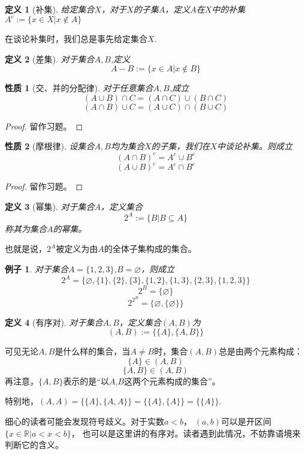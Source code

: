 \documentclass[a4paper, 11pt]{article} %
\newtheorem{prop}{性质}[subsection]
\newtheorem{definition}{定义}[subsection]
\newtheorem{example}{例子}[subsection]
\begin{document}
\begin{definition}[补集]
给定集合$X$，对于$X$的子集$A$，定义$A$在$X$中的补集
$A^c:=\{x\in X|x\not\in A\}$
\end{definition}
在谈论补集时，我们总是事先给定集合$X$.

\begin{definition}[差集]
对于集合$A,B$,定义
$$A-B:=\{x\in A|x\not\in B\}$$
\end{definition}

\begin{prop}[交、并的分配律]\label{set-fenpeilv}
对于任意集合$A,B$,成立
$$(A\cup B)\cap C=(A\cap C)\cup(B\cap C)$$
$$(A\cap B)\cup C=(A\cup C)\cap(B\cup C)$$
\end{prop}
\begin{proof}
留作习题。
\end{proof}

\begin{prop}[摩根律]\label{set-morgen}
设集合$A,B$均为集合$X$的子集，我们在$X$中谈论补集。则成立
$$(A\cap B)^c=A^c\cup B^c$$
$$(A\cup B)^c=A^c\cap B^c$$
\end{prop}
\begin{proof}
留作习题。
\end{proof}

\begin{definition}[幂集]
对于集合$A$，定义集合
$$2^A:=\{B|B\subseteq A\}$$
称其为集合$A$的幂集。
\end{definition}
也就是说，$2^A$被定义为由$A$的全体子集构成的集合。

\begin{example}对于集合$A=\{1,2,3\}$,$B=\varnothing$，则成立
$$2^A=\{\varnothing,\{1\},\{2\},\{3\},
\{1,2\},\{1,3\},\{2,3\},\{1,2,3\}\}$$
$$2^B=\{\varnothing\}$$
$$2^{2^B}=\{\varnothing,\{\varnothing\}\}$$
\end{example}

\begin{definition}[有序对]
对于集合$A,B$，定义集合$(A,B)$为
$$(A,B):=\{\{A\},\{A,B\}\}$$
\end{definition}
可见无论$A,B$是什么样的集合，当$A\neq B$时，集合$(A,B)$总是由两个元素构成：
$$\{A\}\in(A,B)$$
$$\{A,B\}\in(A,B)$$
再注意，$\{A,B\}$表示的是“以$A$,$B$这两个元素构成的集合”。

特别地，$(A,A)=\{\{A\},\{A,A\}\}=\{\{A\},\{A\}\}=\{\{A\}\}$.

细心的读者可能会发现符号歧义。对于实数$a<b$，
$(a,b)$可以是开区间$\{x\in\mathbb{R}|a<x<b\}$，
也可以是这里讲的有序对。读者遇到此情况，不妨靠语境来判断它的含义。
\end{document}

